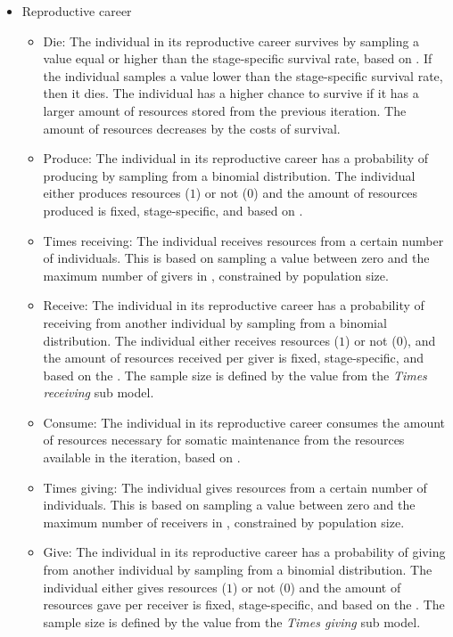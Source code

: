 \documentclass{article}
\begin{document}
\begin{itemize}
\begin{itemize}
\begin{itemize}
        \end{itemize}
    \end{itemize}
    \item Reproductive career
    \begin{itemize}
        \item Die: The individual in its reproductive career survives by sampling a value equal or higher than the stage-specific survival rate, based on \cite{gurven2007longevity}. If the individual samples a value lower than the stage-specific survival rate, then it dies. The individual has a higher chance to survive if it has a larger amount of resources stored from the previous iteration. The amount of resources decreases by the costs of survival.
        \item Produce: The individual in its reproductive career has a probability of producing by sampling from a binomial distribution. The individual either produces resources ($1$) or not ($0$) and the amount of resources produced is fixed, stage-specific, and based on \cite{koster2020life}.
        \item Times receiving: The individual receives resources from a certain number of individuals. This is based on sampling a value between zero and the maximum number of givers in \cite{gurven2004give}, constrained by population size.
        \item Receive: The individual in its reproductive career has a probability of receiving from another individual by sampling from a binomial distribution. The individual either receives resources ($1$) or not ($0$), and the amount of resources received per giver is fixed, stage-specific, and based on the \cite{gurven2004give}. The sample size is defined by the value from the \emph{Times receiving} sub model. 
        \item Consume: The individual in its reproductive career consumes the amount of resources necessary for somatic maintenance from the resources available in the iteration, based on \cite{kaplan2000theory,pontzer2021daily}.
        \item Times giving: The individual gives resources from a certain number of individuals. This is based on sampling a value between zero and the maximum number of receivers in \cite{gurven2004give}, constrained by population size.
        \item Give: The individual in its reproductive career has a probability of giving from another individual by sampling from a binomial distribution. The individual either gives resources ($1$) or not ($0$) and the amount of resources gave per receiver is fixed, stage-specific, and based on the \cite{gurven2004give}. The sample size is defined by the value from the \emph{Times giving} sub model. 

\end{itemize}
\end{itemize}
\end{document}
